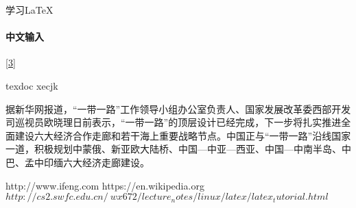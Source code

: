 \documentclass{article}
\begin{document}
\begin{titlepage}
  学习LaTeX
\end{titlepage}

\paragraph{中文输入} \ref{3}

texdoc xecjk


据新华网报道，“一带一路”工作领导小组办公室负责人、国家发展改革委西部开发司巡视员欧晓理日前表示，“一带一路”的顶层设计已经完成，下一步将扎实推进全面建设六大经济合作走廊和若干海上重要战略节点。中国正与“一带一路”沿线国家一道，积极规划中蒙俄、新亚欧大陆桥、中国—中亚—西亚、中国—中南半岛、中巴、孟中印缅六大经济走廊建设。\cite{1}


\begin{thebibliography}{99}
 http://www.ifeng.com
 https://en.wikipedia.org
 $http://cs2.swfc.edu.cn/~wx672/lecture_notes/linux/latex/latex_tutorial.html$
\end{thebibliography}
\end{document}

